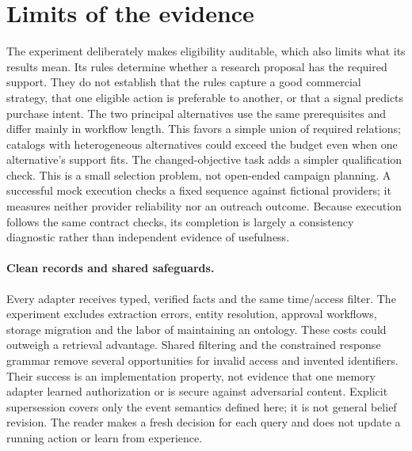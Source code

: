 \section{Limits of the evidence}
\label{sec:limitations}
The experiment deliberately makes eligibility auditable, which also limits what its results mean. Its rules determine whether a research proposal has the required support. They do not establish that the rules capture a good commercial strategy, that one eligible action is preferable to another, or that a signal predicts purchase intent. The two principal alternatives use the same prerequisites and differ mainly in workflow length. This favors a simple union of required relations; catalogs with heterogeneous alternatives could exceed the budget even when one alternative's support fits. The changed-objective task adds a simpler qualification check. This is a small selection problem, not open-ended campaign planning. A successful mock execution checks a fixed sequence against fictional providers; it measures neither provider reliability nor an outreach outcome. Because execution follows the same contract checks, its completion is largely a consistency diagnostic rather than independent evidence of usefulness.

\paragraph{Clean records and shared safeguards.}
Every adapter receives typed, verified facts and the same time/access filter. The experiment excludes extraction errors, entity resolution, approval workflows, storage migration and the labor of maintaining an ontology. These costs could outweigh a retrieval advantage. Shared filtering and the constrained response grammar remove several opportunities for invalid access and invented identifiers. Their success is an implementation property, not evidence that one memory adapter learned authorization or is secure against adversarial content. Explicit supersession covers only the event semantics defined here; it is not general belief revision. The reader makes a fresh decision for each query and does not update a running action or learn from experience.

